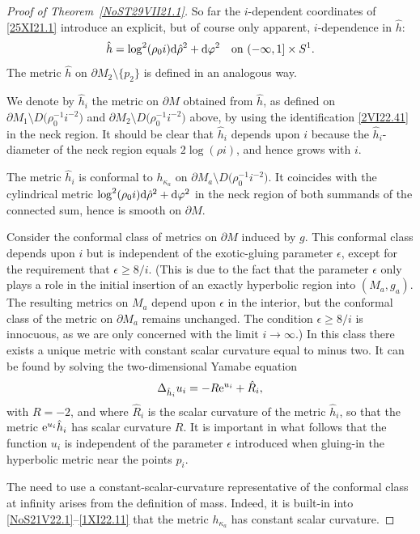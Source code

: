 \documentclass[pdftex]{sigma}
\numberwithin{equation}{section}
\newcommand{\hhi}{{\red{\hat h_{i}}}}
\newcommand{\hRi}{{\red{\hat R_{i}}}}
\newcommand{\rhozero}{\red{\rho_0}}
\newcommand{\red}[1]{{\color{red}#1}}
\newcommand{\hrho}{\hat\rho}
\renewcommand{\red}[1]{#1}
\begin{document}
\begin{proof}[Proof of Theorem~\ref{NoST29VII21.1}]
So far the $i$-dependent coordinates of \eqref{25XI21.1} introduce an explicit, but of course only apparent, $i$-dependence in $\hat h$:
\[
\hat h = \red{\log}^2( \rhozero i) {\rm d}\hrho^2 + {\rm d}\varphi^2 \quad \text{on} \ (-\infty,1]\times S^1.
\]
The metric $\hat h $ on $\partial M_2\setminus \{p_2\}$ is defined in an analogous way.

We denote by $\hhi $ the metric on $\partial M$ obtained from $\hat h$, as defined on
$\partial M_1 \setminus D\big(\rhozero^{-1}i^{-2}\big) $ and $\partial M_2\setminus D\big(\rhozero^{-1}i^{-2}\big) $ above, by using the identification \eqref{2VI22.41} in the neck region. It should be clear that $\hhi$ depends upon $i$ because the $\hhi$-diameter of the neck region equals $2 \log(\rho i)$, and hence grows with $i$.

The metric $\hhi$ is
conformal to $h_{\kappa_a}$ on $\partial M_a\setminus \red{D\big(\rhozero^{-1}i^{-2}\big)}$. It coincides with the cylindrical metric $ \red{\log}^2(\rhozero i) {\rm d}\hrho^2 + {\rm d}\varphi^2 $ in the neck region of both summands of the connected sum, hence is smooth on $\partial M$.

Consider the conformal class of metrics on $\partial M$ induced by $g$.
This conformal class depends upon $i$ but is independent of the exotic-gluing parameter $\epsilon$, except for the requirement that $\epsilon \ge \red{8}/i$.
(This is due to the fact that the parameter $\epsilon$ only plays a role in the initial insertion of an exactly hyperbolic region into $(M_a,g_a)$. The resulting metrics on $M_a$ depend upon $\epsilon$ in the interior, but the conformal class of the metric on $\partial M_a$ remains unchanged.
The condition $\epsilon \ge \red{8}/i$ is innocuous, as we are only concerned with the limit $i\to\infty$.)
In this class there exists a unique metric with constant scalar curvature equal to minus two.
It can be found by solving the two-dimensional Yamabe equation
\begin{equation}\label{NoS31VII21.31}
 \Delta_{\hhi }u_i = - R {\rm e}^{ u_i} + \hRi,
\end{equation}
with $R=-2$, and where $\hRi $ is the scalar curvature of the metric $\hhi $, so that the metric ${\rm e}^{ u_i}\hhi $ has scalar curvature $R$.
It is important in what follows that the function $u_i$ is independent of the parameter $\epsilon$ introduced when gluing-in the hyperbolic metric near the points $p_i$.

The need to use a constant-scalar-curvature representative of the conformal class at infinity arises from the definition of mass. Indeed, it is built-in into \eqref{NoS21V22.1}--\eqref{1XI22.11} that the metric $h_{\kappa_a}$ has constant scalar curvature.


\end{proof}
\end{document}
